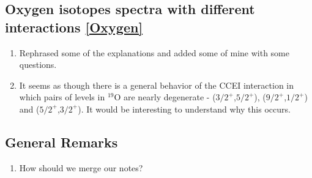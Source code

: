 \documentclass[12pt,a4paper]{article}
\begin{document}
\subsection{Oxygen isotopes spectra with different interactions \ref{Oxygen}}
\begin{enumerate}
	\item Rephrased some of the explanations and added some of mine with some questions.
	\item It seems as though there is a general behavior of the CCEI interaction in which pairs of levels in $^{19}$O are nearly degenerate - ($3/2^+$,$5/2^+$), ($9/2^+$,$1/2^+$) and ($5/2^+$,$3/2^+$). It would be interesting to understand why this occurs.
\end{enumerate}

\subsection{General Remarks}
\begin{enumerate}
	\item How should we merge our notes?
\end{enumerate}
\end{document}
